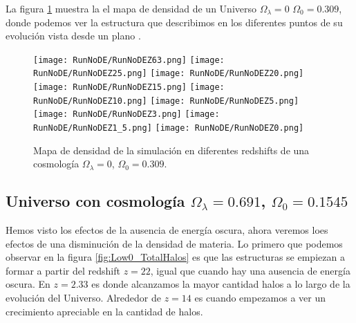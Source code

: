 La figura \ref{fig:NoDE-DensityMap} muestra la el mapa de densidad de un Universo $\Omega_\lambda = 0$ $\Omega_0 = 0.309$, donde podemos ver la estructura que describimos  en los diferentes puntos de su evolución vista desde un plano .
\begin{figure}[H]
    \centering

    \texttt{[image: RunNoDE/RunNoDEZ63.png]}   %
    \texttt{[image: RunNoDE/RunNoDEZ25.png]}   %
    \texttt{[image: RunNoDE/RunNoDEZ20.png]}   %
    \\
    \texttt{[image: RunNoDE/RunNoDEZ15.png]}   %
    \texttt{[image: RunNoDE/RunNoDEZ10.png]}   %
    \texttt{[image: RunNoDE/RunNoDEZ5.png]}    %
    \\
    \texttt{[image: RunNoDE/RunNoDEZ3.png]}    %
    \texttt{[image: RunNoDE/RunNoDEZ1\_5.png]}  %
    \texttt{[image: RunNoDE/RunNoDEZ0.png]}    %
    \caption[Mapa de densidad en en diferentes redshift]{ \footnotesize Mapa de densidad de la simulación en diferentes redshifts de una cosmología $\Omega_\lambda = 0$, $\Omega_0 = 0.309$. }
    \label{fig:NoDE-DensityMap}
\end{figure}


\subsection{Universo con cosmología \texorpdfstring{$\Omega_\lambda = 0.691$, $\Omega_0 = 0.1545$ }{Omega lambda = 0.691, Omega 0 = 0.1545}  }

Hemos visto los efectos de la ausencia de energía oscura, ahora veremos loes efectos de una disminución de la densidad de materia. Lo primero que podemos observar en la figura \ref{fig:Low0_TotalHalos} es que las estructuras se empiezan a formar a partir del redshift $z=22$, igual que cuando  hay una ausencia de energía oscura. En $z= 2.33$ es donde alcanzamos la mayor cantidad halos a lo largo de la evolución del Universo. Alrededor de $z = 14$ es cuando empezamos a ver un crecimiento apreciable en la cantidad de halos.

